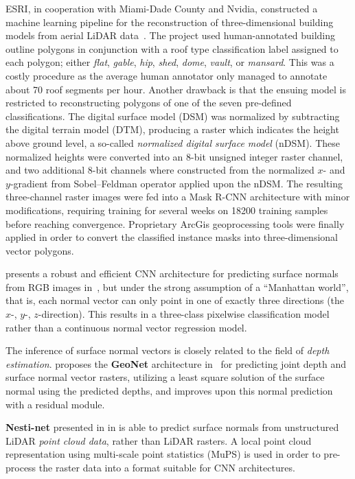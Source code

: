 ESRI, in cooperation with Miami-Dade County and Nvidia, constructed a machine learning pipeline for the reconstruction of three-dimensional building models from aerial LiDAR data~\cite{esri-reconstruction}.
The project used human-annotated building outline polygons in conjunction with a roof type classification label assigned to each polygon; either \textit{flat}, \textit{gable}, \textit{hip}, \textit{shed}, \textit{dome}, \textit{vault}, or \textit{mansard}.
This was a costly procedure as the average human annotator only managed to annotate about 70 roof segments per hour.
Another drawback is that the ensuing model is restricted to reconstructing polygons of one of the seven pre-defined classifications.
The digital surface model (DSM) was normalized by subtracting the digital terrain model (DTM), producing a raster which indicates the height above ground level, a so-called \textit{normalized digital surface model} (nDSM).
These normalized heights were converted into an 8-bit unsigned integer raster channel, and two additional 8-bit channels where constructed from the normalized $x$- and $y$-gradient from Sobel–Feldman operator applied upon the nDSM.
The resulting three-channel raster images were fed into a Mask R-CNN architecture with minor modifications, requiring training for several weeks on \num{18200} training samples before reaching convergence.
Proprietary ArcGis geoprocessing tools were finally applied in order to convert the classified instance masks into three-dimensional vector polygons.

\citeauthor{surface-normal-estimation} presents a robust and efficient CNN architecture for predicting surface normals from RGB images in~\cite{surface-normal-estimation}, but under the strong assumption of a \enquote{Manhattan world}, that is, each normal vector can only point in one of exactly three directions (the $x$-, $y$-, $z$-direction).
This results in a three-class pixelwise classification model rather than a continuous normal vector regression model.

The inference of surface normal vectors is closely related to the field of \textit{depth estimation}.
\citeauthor{geonet} proposes the \textbf{GeoNet} architecture in~\cite{geonet} for predicting joint depth and surface normal vector rasters, utilizing a least square solution of the surface normal using the predicted depths, and improves upon this normal prediction with a residual module.

\textbf{Nesti-net} presented in \cite{nestinet} in \citeyear{nestinet} is able to predict surface normals from unstructured LiDAR \emph{point cloud data}, rather than LiDAR rasters.
A local point cloud representation using multi-scale point statistics (MuPS) is used in order to pre-process the raster data into a format suitable for CNN architectures.
